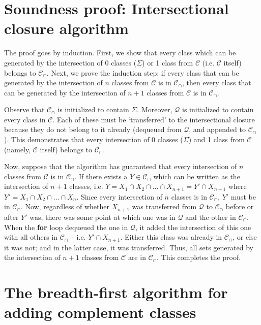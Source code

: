 \documentclass[11pt, oneside]{article}   	%
\begin{document}
\appendix

\section{Soundness proof: Intersectional closure algorithm}
\label{app:intersectionproof}

The proof goes by induction. First, we show that every class which can be generated by the intersection of $0$ classes ($\Sigma$) or 1 class from $\mathcal C$ (i.e. $\mathcal C$ itself) belongs to $\mathcal C_\cap$. Next, we prove the induction step: if every class that can be generated by the intersection of $n$ classes from $\mathcal C$ is in $\mathcal C_\cap$, then every class that can be generated by the intersection of $n+1$ classes from $\mathcal C$ is in $\mathcal C_\cap$.

Observe that $\mathcal C_\cap$ is initialized to contain $\Sigma$. Moreover, $\mathcal Q$ is initialized to contain every class in $\mathcal C$. Each of these must be `transferred' to the intersectional closure because they do not belong to it already (dequeued from $\mathcal Q$, and appended to $\mathcal C_\cap$). This demonstrates that every intersection of 0 classes ($\Sigma$) and 1 class from $\mathcal C$ (namely, $\mathcal C$ itself) belongs to $\mathcal C_\cap$.

Now, suppose that the algorithm has guaranteed that every intersection of $n$ classes from $\mathcal C$ is in $\mathcal C_\cap$. If there exists a $Y \in \mathcal C_\cap$ which can be written as the intersection of $n+1$ classes, i.e. $Y = X_1 \cap X_2 \cap \ldots \cap X_{n+1} = Y' \cap X_{n+1}$ where $Y' = X_1 \cap X_2 \cap \ldots \cap X_n$. Since every intersection of $n$ classes is in $\mathcal C_\cap$, $Y'$ must be in $\mathcal C_\cap$. Now, regardless of whether $X_{n+1}$ was transferred from $\mathcal Q$ to $\mathcal C_\cap$ before or after $Y'$ was, there was some point at which one was in $\mathcal Q$ and the other in $\mathcal C_\cap$. When the \textbf{for} loop dequeued the one in $\mathcal Q$, it added the intersection of this one with all others in $\mathcal C_\cap$ -- i.e. $Y' \cap X_{n+1}$. Either this class was already in $\mathcal C_\cap$, or else it was not; and in the latter case, it was transferred. Thus, all sets generated by the intersection of $n+1$ classes from $\mathcal C$ are in $\mathcal C_\cap$. This completes the proof.


\section{The breadth-first algorithm for adding complement classes}
\label{app:complements}
\end{document}
